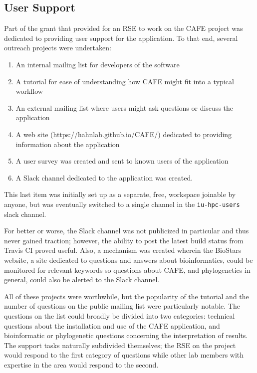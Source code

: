 \documentclass[acmtog, authorversion]{acmart}
\begin{document}
\subsection{User Support}
Part of the grant that provided for an RSE to work on the CAFE project was dedicated to providing user support for the application. To that end, several outreach projects were undertaken: 
\begin{enumerate}
    \item An internal mailing list for developers of the software
    \item A tutorial for ease of understanding how CAFE might fit into a typical workflow
    \item An external mailing list where users might ask questions or discuss the application
    \item A web site (https://hahnlab.github.io/CAFE/) dedicated to providing information about the application
    \item A user survey was created and sent to known users of the application
    \item A Slack channel dedicated to the application was created.
\end{enumerate}
This last item was initially set up as a separate, free, workspace joinable by anyone, but was eventually switched to a single channel in the {\tt iu-hpc-users} slack channel. 
    
For better or worse, the Slack channel was not publicized in particular and thus never gained traction; however, the ability to post the latest build status from Travis CI proved useful. Also, a mechanism was created wherein the BioStars website, a site dedicated to questions and answers about bioinformatics, could be monitored for relevant keywords so questions about CAFE, and phylogenetics in general, could also be alerted to the Slack channel. 
    
All of these projects were worthwhile, but the popularity of the tutorial and the number of questions on the public mailing list were particularly notable. The questions on the list could broadly be divided into two categories: technical questions about the installation and use of the CAFE application, and bioinformatic or phylogenetic questions concerning the interpretation of results. The support tasks naturally subdivided themselves; the RSE on the project would respond to the first category of questions while other lab members with expertise in the area would respond to the second.
\end{document}
